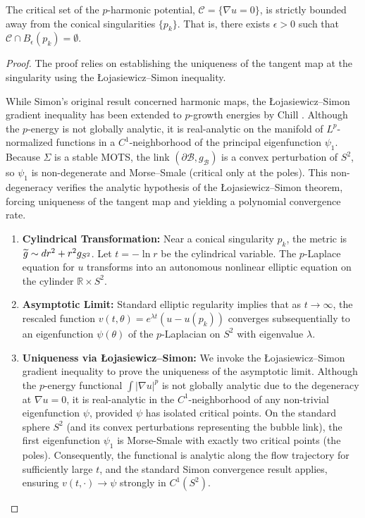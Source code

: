 \begin{lemma}\label{lem:RefinedAsymptotics}
The critical set of the $p$-harmonic potential, $\mathcal{C} = \{ \nabla u = 0 \}$, is strictly bounded away from the conical singularities $\{p_k\}$. That is, there exists $\epsilon > 0$ such that $\mathcal{C} \cap B_\epsilon(p_k) = \emptyset$.
\end{lemma}
\begin{proof}
The proof relies on establishing the uniqueness of the tangent map at the singularity using the \L{}ojasiewicz--Simon inequality.
\begin{remark}
While Simon's original result concerned harmonic maps, the \L{}ojasiewicz--Simon gradient inequality has been extended to $p$-growth energies by Chill \cite{chill2003}. Although the $p$-energy is not globally analytic, it is real-analytic on the manifold of $L^p$-normalized functions in a $C^1$-neighborhood of the principal eigenfunction $\psi_1$. Because $\Sigma$ is a stable MOTS, the link $(\partial \mathcal{B}, g_{\mathcal B})$ is a convex perturbation of $S^2$, so $\psi_1$ is non-degenerate and Morse--Smale (critical only at the poles). This non-degeneracy verifies the analytic hypothesis of the \L{}ojasiewicz--Simon theorem, forcing uniqueness of the tangent map and yielding a polynomial convergence rate.
\end{remark}
\begin{enumerate}
    \item \textbf{Cylindrical Transformation:} Near a conical singularity $p_k$, the metric is $\widetilde{g} \sim dr^2 + r^2 g_{S^2}$. Let $t = -\ln r$ be the cylindrical variable. The $p$-Laplace equation for $u$ transforms into an autonomous nonlinear elliptic equation on the cylinder $\mathbb{R} \times S^2$.
    \item \textbf{Asymptotic Limit:} Standard elliptic regularity implies that as $t \to \infty$, the rescaled function $v(t,\theta) = e^{\lambda t} (u - u(p_k))$ converges subsequentially to an eigenfunction $\psi(\theta)$ of the $p$-Laplacian on $S^2$ with eigenvalue $\lambda$.
    \item \textbf{Uniqueness via \L{}ojasiewicz--Simon:} We invoke the \L{}ojasiewicz--Simon gradient inequality to prove the uniqueness of the asymptotic limit. Although the $p$-energy functional $\int |\nabla u|^p$ is not globally analytic due to the degeneracy at $\nabla u = 0$, it is real-analytic in the $C^1$-neighborhood of any non-trivial eigenfunction $\psi$, provided $\psi$ has isolated critical points. On the standard sphere $S^2$ (and its convex perturbations representing the bubble link), the first eigenfunction $\psi_1$ is Morse-Smale with exactly two critical points (the poles). Consequently, the functional is analytic along the flow trajectory for sufficiently large $t$, and the standard Simon convergence result \cite{simon1983} applies, ensuring $v(t, \cdot) \to \psi$ strongly in $C^1(S^2)$.

\end{enumerate}
\end{proof}
